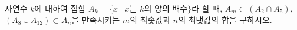 자연수 $k$에 대하여 집합 $A_k=\{x \mid x$는 $k$의 양의 배수$\}$라 할 때, $A_m\subset(A_2\cap A_5)$, $(A_8\cup A_{12})\subset A_n$을 만족시키는 $m$의 최솟값과 $n$의 최댓값의 합을 구하시오. 
